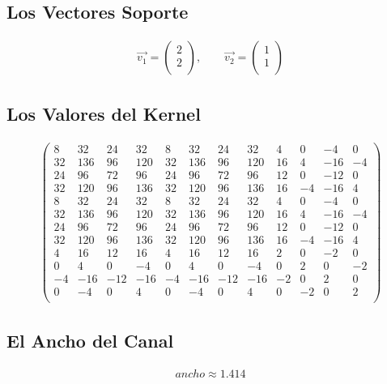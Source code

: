 \documentclass[fleqn]{llncs}
\begin{document}
\newpage

\subsection{Los Vectores Soporte}
\begin{align*}
	\overrightarrow{v_1} =
	\begin{pmatrix}
		2 \\
		2 \\
	\end{pmatrix},
	\qquad
	\overrightarrow{v_2} =
	\begin{pmatrix}
		1 \\
		1 \\
	\end{pmatrix}
\end{align*}

\subsection{Los Valores del Kernel}
\begin{align*}
	\begin{pmatrix}
		8 & 32 & 24 & 32 &  8 & 32 & 24 & 32 &  4 &  0 & -4 &  0 \\
		32 &136 & 96 &120 & 32 &136 & 96 &120 & 16 &  4 &-16 & -4 \\
		24 & 96 & 72 & 96 & 24 & 96 & 72 & 96 & 12 &  0 &-12 &  0 \\
		32 &120 & 96 &136 & 32 &120 & 96 &136 & 16 & -4 &-16 &  4 \\
		8 & 32 & 24 & 32 &  8 & 32 & 24 & 32 &  4 &  0 & -4 &  0 \\
		32 &136 & 96 &120 & 32 &136 & 96 &120 & 16 &  4 &-16 & -4 \\
		24 & 96 & 72 & 96 & 24 & 96 & 72 & 96 & 12 &  0 &-12 &  0 \\
		32 &120 & 96 &136 & 32 &120 & 96 &136 & 16 & -4 &-16 &  4 \\
		4 & 16 & 12 & 16 &  4 & 16 & 12 & 16 &  2 &  0 & -2 &  0 \\
		0 &  4 &  0 & -4 &  0 &  4 &  0 & -4 &  0 &  2 &  0 & -2 \\
		-4 &-16 &-12 &-16 & -4 &-16 &-12 &-16 & -2 &  0 &  2 &  0 \\
		0 & -4 &  0 &  4 &  0 & -4 &  0 &  4 &  0 & -2 &  0 &  2 \\
	\end{pmatrix}
\end{align*}

\subsection{El Ancho del Canal}
\begin{align*}
	ancho \approx 1.414
\end{align*}
\end{document}

